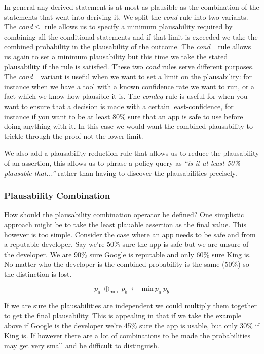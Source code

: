 \documentclass[thesis.tex]{subfiles}
\begin{document}
In general any derived statement is at most as plausible as the
combination of the statements that went into deriving it.  We split
the \emph{cond} rule into two variants.  The \emph{cond$\leq$} rule
allows us to specify a minimum plausability required by combining all
the conditional statements and if that limit is exceeded we take the
combined probability in the plausability of the outcome.  The
\emph{cond=} rule allows us again to set a minimum plausability but
this time we take the stated plausability if the rule is satisfied.
These two \emph{cond} rules serve different purposes.  The
\emph{cond=} variant is useful when we want to set a limit on the
plausability: for instance when we have a tool with a known confidence
rate we want to run, or a fact which we know how plausible it is.  The
\emph{cond$eq$} rule is useful for when you want to ensure that a
decision is made with a certain least-confidence, for instance if you
want to be at least 80\% sure that an app is safe to use before doing
anything with it.  In this case we would want the combined
plausability to trickle through the proof not the lower limit.

We also add a plausability reduction rule that allows us to reduce the
plausability of an assertion, this allows us to phrase a policy query
as \emph{``is it at least 50\% plausable that...''} rather than having
to discover the plausabilities precisely.

\subsubsection{Plausability Combination}

How should the plausability combination operator be defined?  One
simplistic approach might be to take the least plauable assertion as
the final value.  This however is too simple. Consider the case where
an app needs to be safe and from a reputable developer.  Say we're
50\% sure the app is safe but we are unsure of the developer. We are
90\% sure Google is reputable and only 60\% sure King is.  No matter
who the developer is the combined probability is the same (50\%) so
the distinction is lost.

\begin{equation}
  p_a~\oplus_{\text{min}}~p_b~\gets~\text{min}~p_a~p_b
\end{equation}

If we are sure the plausabilities are independent we could multiply
them together to get the final plausability. This is appealing in that
if we take the example above if Google is the developer we're 45\%
sure the app is usable, but only 30\% if King is.  If however there
are a lot of combinations to be made the probabilities may get very
small and be difficult to distinguish.
\end{document}
